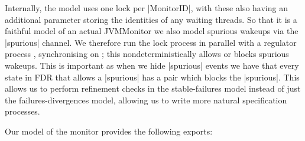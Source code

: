 
Internally, the model uses one lock per |MonitorID|, with these also having an additional parameter storing the identities of any waiting threads. So that it is a faithful model of an actual JVMMonitor we also model spurious wakeups via the |spurious| channel. We therefore run the lock process in parallel with a regulator process , synchronising on ; this nondeterministically allows or blocks spurious wakeups. This is important as when we hide |spurious| events we have that every state in FDR that allows a |spurious| has a pair which blocks the |spurious|. This allows us to perform refinement checks in the stable-failures model instead of just the failures-divergences model, allowing us to write more natural specification processes. %

Our model of the monitor provides the following exports:


